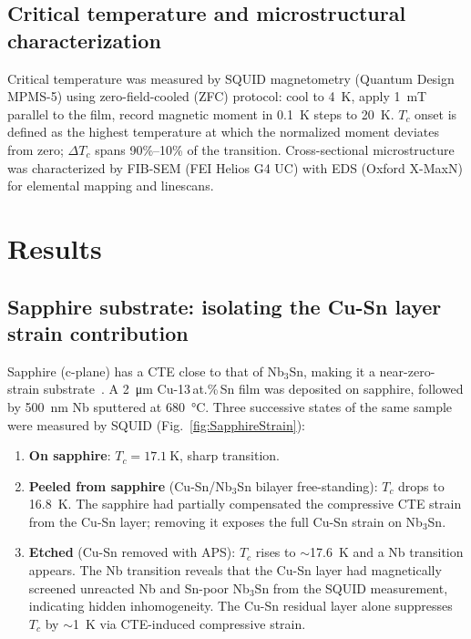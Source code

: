 \documentclass{iopjournal}
\begin{document}
\subsection{Critical temperature and microstructural characterization}

Critical temperature was measured by SQUID magnetometry (Quantum Design MPMS-5) using zero-field-cooled (ZFC) protocol: cool to \qty{4}{\kelvin}, apply \qty{1}{\milli\tesla} parallel to the film, record magnetic moment in \qty{0.1}{\kelvin} steps to \qty{20}{\kelvin}. $T_c$ onset is defined as the highest temperature at which the normalized moment deviates from zero; $\Delta T_c$ spans 90\%--10\% of the transition. Cross-sectional microstructure was characterized by FIB-SEM (FEI Helios G4 UC) with EDS (Oxford X-MaxN) for elemental mapping and linescans.


\section{Results}

\subsection{Sapphire substrate: isolating the Cu-Sn layer strain contribution}

Sapphire (c-plane) has a CTE close to that of Nb$_3$Sn, making it a near-zero-strain substrate~\cite{eastonPredictionStressState1980}. A \qty{2}{\micro\meter} Cu-13\,at.\%\,Sn film was deposited on sapphire, followed by \qty{500}{\nano\meter} Nb sputtered at \qty{680}{\degreeCelsius}. Three successive states of the same sample were measured by SQUID (Fig.~\ref{fig:SapphireStrain}):

\begin{enumerate}
    \item \textbf{On sapphire}: $T_c = \qty{17.1}{\kelvin}$, sharp transition.
    \item \textbf{Peeled from sapphire} (Cu-Sn/Nb$_3$Sn bilayer free-standing): $T_c$ drops to \qty{16.8}{\kelvin}. The sapphire had partially compensated the compressive CTE strain from the Cu-Sn layer; removing it exposes the full Cu-Sn strain on Nb$_3$Sn.
    \item \textbf{Etched} (Cu-Sn removed with APS): $T_c$ rises to $\sim$\qty{17.6}{\kelvin} and a Nb transition appears. The Nb transition reveals that the Cu-Sn layer had magnetically screened unreacted Nb and Sn-poor Nb$_3$Sn from the SQUID measurement, indicating hidden inhomogeneity. The Cu-Sn residual layer alone suppresses $T_c$ by $\sim$\qty{1}{\kelvin} via CTE-induced compressive strain.
\end{enumerate}
\end{document}
